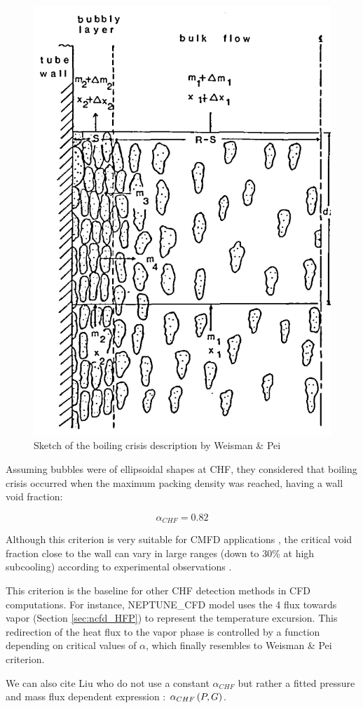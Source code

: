\begin{figure}[!h]
\centering
\includegraphics[width=0.4\linewidth]{img/chf/chf_weisman.png}
\caption{Sketch of the boiling crisis description by Weisman \& Pei}
\label{fig:chf_weisman}
\end{figure}

\npar

Assuming bubbles were of ellipsoidal shapes at CHF, they considered that boiling crisis occurred when the maximum packing density was reached, \ie having a wall void fraction:

\begin{equation}
\alpha_{CHF} = 0.82
\end{equation} 

Although this criterion is very suitable for CMFD applications \cite{mimouni_computational_2016, liu_critical_2021}, the critical void fraction close to the wall can vary in large ranges (down to 30\% at high subcooling) according to experimental observations \cite{bruder_empirical_2018}.

\begin{remark*}{}
This criterion is the baseline for other CHF detection methods in CFD computations. For instance, NEPTUNE\_CFD model uses the 4 flux towards vapor (Section \ref{sec:ncfd_HFP}) to represent the temperature excursion. This redirection of the heat flux to the vapor phase is controlled by a function depending on critical values of $\alpha$, which finally resembles to Weisman \& Pei criterion.

\npar

We can also cite Liu \etal \cite{liu_critical_2021} who do not use a constant $\alpha_{CHF}$ but rather a fitted pressure and mass flux dependent expression : $\alpha_{CHF}\left( P,G \right)$.
\end{remark*}

